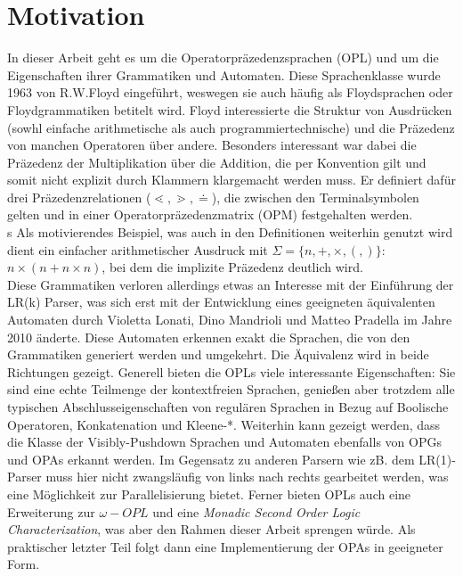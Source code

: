 \section{Motivation}
In dieser Arbeit geht es um die Operatorpräzedenzsprachen (OPL) und um die Eigenschaften ihrer Grammatiken und Automaten. Diese Sprachenklasse wurde 1963 von R.W.Floyd eingeführt, weswegen sie auch häufig als Floydsprachen oder Floydgrammatiken betitelt wird. Floyd interessierte die Struktur von Ausdrücken (sowhl einfache arithmetische als auch programmiertechnische) und die Präzedenz von manchen Operatoren über andere. Besonders interessant war dabei die Präzedenz der Multiplikation über die Addition, die per Konvention gilt und somit nicht explizit durch Klammern klargemacht werden muss. Er definiert dafür drei Präzedenzrelationen ($\lessdot, \gtrdot, \doteq$), die zwischen den Terminalsymbolen gelten und in einer Operatorpräzedenzmatrix (OPM) festgehalten werden.\\s
Als motivierendes Beispiel, was auch in den Definitionen weiterhin genutzt wird dient ein einfacher arithmetischer Ausdruck mit $\Sigma = \{n, +, \times, (, )\}$:\\ $ n \times (n + n \times n)$, bei dem die implizite Präzedenz deutlich wird.\\
Diese Grammatiken verloren allerdings etwas an Interesse mit der Einführung der LR(k) Parser, was sich erst mit der Entwicklung eines geeigneten äquivalenten Automaten durch Violetta Lonati, Dino Mandrioli und Matteo Pradella im Jahre 2010 änderte. Diese Automaten erkennen exakt die Sprachen, die von den Grammatiken generiert werden und umgekehrt. Die Äquivalenz wird in beide Richtungen gezeigt.
Generell bieten die OPLs viele interessante Eigenschaften: Sie sind eine echte Teilmenge der kontextfreien Sprachen, genießen aber trotzdem alle typischen Abschlusseigenschaften von regulären Sprachen in Bezug auf Boolische Operatoren, Konkatenation und Kleene-*. 
Weiterhin kann gezeigt werden, dass die Klasse der Visibly-Pushdown Sprachen und Automaten ebenfalls von OPGs und OPAs erkannt werden. Im Gegensatz zu anderen Parsern wie zB. dem LR(1)- Parser muss hier nicht zwangsläufig von links nach rechts gearbeitet werden, was eine Möglichkeit zur Parallelisierung bietet. Ferner bieten OPLs auch eine Erweiterung zur $\omega- OPL$ und eine \textit{Monadic Second Order Logic Characterization}, was aber den Rahmen dieser Arbeit sprengen würde.
Als praktischer letzter Teil folgt dann eine Implementierung der OPAs in geeigneter Form.